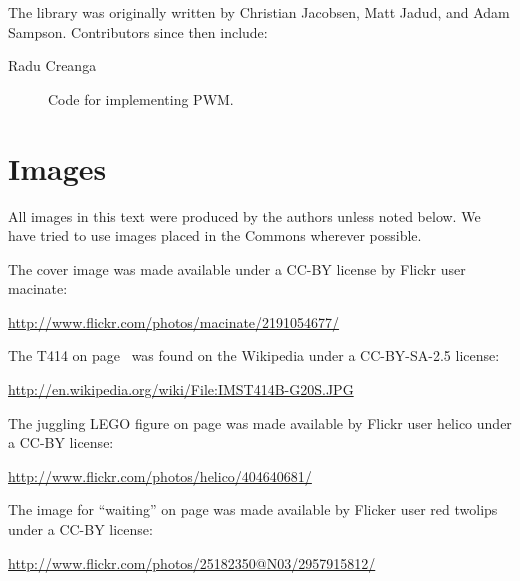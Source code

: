 The \plumbing library was originally written by Christian Jacobsen, Matt Jadud, and Adam Sampson. Contributors since then include:

\begin{description}
	\item[Radu Creanga] Code for implementing PWM.
\end{description}

\newpage

\section{Images}
All images in this text were produced by the authors unless noted below. We have tried to use images placed in the Commons wherever possible.

The cover image was made available under a CC-BY license by Flickr user macinate:

\small{\url{http://www.flickr.com/photos/macinate/2191054677/}}

The T414 on page~\pageref{image:t414} was found on the Wikipedia under a CC-BY-SA-2.5 license:

\small{\url{http://en.wikipedia.org/wiki/File:IMST414B-G20S.JPG}}

The juggling LEGO figure on page \pageref{image:juggling} was made available by Flickr user helico under a CC-BY license:

\small{\url{http://www.flickr.com/photos/helico/404640681/}}

The image for ``waiting'' on page \pageref{medio:waiting} was made available by Flicker user red twolips under a CC-BY license:

\small{\url{http://www.flickr.com/photos/25182350@N03/2957915812/}}

